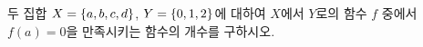 두 집합 $X=\{a{,}\mkern3mu\mathopen{}b{,}\mkern3mu\mathopen{}c{,}\mkern3mu\mathopen{}d\}$, $Y=\{0{,}\mkern3mu\mathopen{}1{,}\mkern3mu\mathopen{}2\}$에 대하여 $X$에서 $Y$로의 함수 $f$ 중에서 $f(a)=0$을 만족시키는 함수의 개수를 구하시오.
